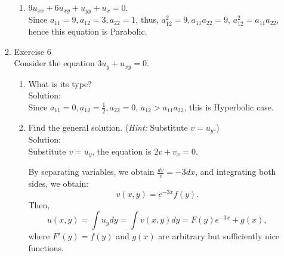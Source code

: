 \documentclass[12pt]{article}%
\begin{document}
\begin{enumerate}
\begin{enumerate}
\begin{enumerate}
            \item $9u_{xx} + 6u_{xy} + u_{yy} + u_x = 0$. \smallskip \\
            Since $a_{11}=9,a_{12}=3,a_{22}=1$, thus, $a_{12}^2=9, a_{11}a_{22}=9$, $a_{12}^2=a_{11}a_{22}$, hence this equation is Parabolic.
        \end{enumerate}
        \item Exercise 6 \smallskip \\
        Consider the equation $3u_y + u_{xy} =0$.
        \begin{enumerate}
            \item What is its type? \smallskip \\
        Solution:\\
        Since $a_{11}=0,a_{12}=\frac{1}{2},a_{22}=0$, $a_{12}>a_{11}a_{22}$, this is Hyperbolic case.
            
            \item Find the general solution. (\emph{Hint:} Substitute $v = u_y$.) \smallskip \\
            Solution:\\
            Substitute $v = u_y$, the equation is $2v+v_{x}=0$. 

            By separating variables, we obtain $\frac{dv}{v}=-3dx$, and integrating both sides,
            we obtain:
            \[v(x,y)=e^{-3x}f(y).\]
            Then, \[u(x,y)=\int u_{y}dy= \int v(x,y) dy= F(y)e^{-3x}+g(x),\]  where $F'(y)=f(y)$ and $g(x)$ are arbitrary but sufficiently nice functions.
            

\end{enumerate}
\end{enumerate}
\end{enumerate}
\end{document}
